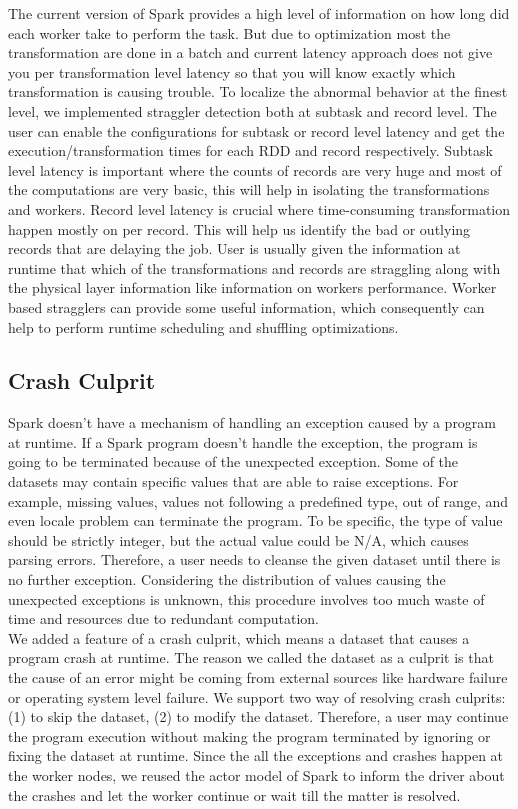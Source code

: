 \documentclass{acm_proc_article-sp}
\begin{document}
The current version of Spark provides a high level of information on how long did each worker take to perform the task. But due to optimization most the transformation are done in a batch and current latency approach does not give you per transformation level latency so that you will know exactly which transformation is causing trouble. To localize the abnormal behavior at the finest level, we implemented straggler detection both at subtask and record level. The user can enable the configurations for subtask or record level latency and get the execution/transformation times for each RDD and record respectively. Subtask level latency is important where the counts of records are very huge and most of the computations are very basic, this will help in isolating the transformations and workers. Record level latency is crucial where time-consuming transformation happen mostly on per record. This will help us identify the bad or outlying records that are delaying the job. User is usually given the information at runtime that which of the transformations and records are straggling along with the physical layer information like information on workers performance. Worker based stragglers can provide some useful information, which consequently can help to perform runtime scheduling and shuffling optimizations.

\subsection{Crash Culprit}

Spark doesn't have a mechanism of handling an exception caused by a program at runtime. If a Spark program doesn't handle the exception, the program is going to be terminated because of the unexpected exception. Some of the datasets may contain specific values that are able to raise exceptions. For example, missing values, values not following a predefined type, out of range, and even locale problem can terminate the program. To be specific, the type of value should be strictly integer, but the actual value could be N/A, which causes parsing errors. Therefore, a user needs to cleanse the given dataset until there is no further exception. Considering the distribution of values causing the unexpected exceptions is unknown, this procedure involves too much waste of time and resources due to redundant computation.\\
We added a feature of a crash culprit, which means a dataset that causes a program crash at runtime. The reason we called the dataset as a culprit is that the cause of an error might be coming from external sources like hardware failure or operating system level failure. We support two way of resolving crash culprits: (1) to skip the dataset, (2) to modify the dataset. Therefore, a user may continue the program execution without making the program terminated by ignoring or fixing the dataset at runtime. Since the all the exceptions and crashes happen at the worker nodes, we reused the actor model of Spark to inform the driver about the crashes and let the worker continue or wait till the matter is resolved. 
\end{document}
